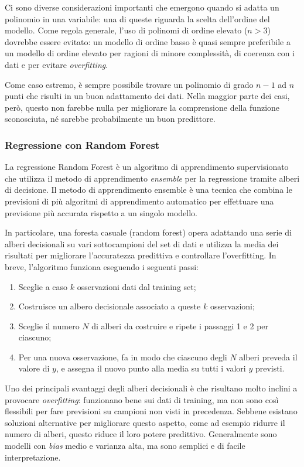 Ci sono diverse considerazioni importanti che emergono quando si adatta un polinomio in una variabile: una di queste riguarda la scelta dell'ordine del modello.
Come regola generale, l'uso di polinomi di ordine elevato ($n > 3$) dovrebbe essere evitato: un modello di ordine basso è quasi sempre preferibile a un modello di ordine elevato per ragioni di minore complessità, di coerenza con i dati e per evitare \textit{overfitting}.

Come caso estremo, è sempre possibile trovare un polinomio di grado $n-1$ ad $n$ punti che risulti in un buon adattamento dei dati.
Nella maggior parte dei casi, però, questo non farebbe nulla per migliorare la comprensione della funzione sconosciuta, né sarebbe probabilmente un buon predittore.

\subsubsection{Regressione con Random Forest}\label{sssec:regressione-rf}
La regressione Random Forest è un algoritmo di apprendimento supervisionato che utilizza il metodo di apprendimento \textit{ensemble} per la regressione tramite alberi di decisione. Il metodo di apprendimento ensemble è una tecnica che combina le previsioni di più algoritmi di apprendimento automatico per effettuare una previsione più accurata rispetto a un singolo modello. \cite{random_forest}

In particolare, una foresta casuale (random forest) opera adattando una serie di alberi decisionali su vari sottocampioni del set di dati e utilizza la media dei risultati per migliorare l'accuratezza predittiva e controllare l'overfitting.
In breve, l'algoritmo funziona eseguendo i seguenti passi:

\begin{enumerate}
  \item Sceglie a caso $k$ osservazioni dati dal training set;
  \item Costruisce un albero decisionale associato a queste $k$ osservazioni;
  \item Sceglie il numero $N$ di alberi da costruire e ripete i passaggi 1 e 2 per ciascuno;
  \item Per una nuova osservazione, fa in modo che ciascuno degli $N$ alberi preveda il valore di $y$, e assegna il nuovo punto alla media su tutti i valori $y$ previsti.
\end{enumerate}

Uno dei principali svantaggi degli alberi decisionali è che risultano molto inclini a provocare \textit{overfitting}: funzionano bene sui dati di training, ma non sono così flessibili per fare previsioni su campioni non visti in precedenza. Sebbene esistano soluzioni alternative per migliorare questo aspetto, come ad esempio ridurre il numero di alberi, questo riduce il loro potere predittivo. Generalmente sono modelli con \textit{bias} medio e varianza alta, ma sono semplici e di facile interpretazione.

